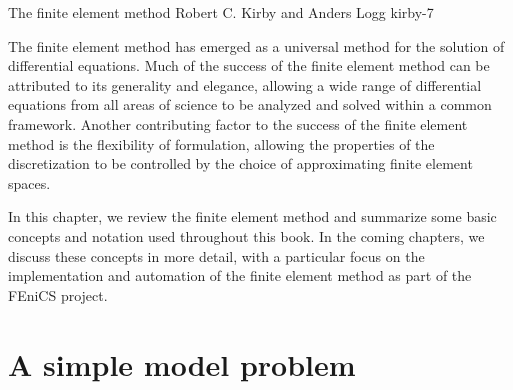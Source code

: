               {The finite element method}
              {Robert C. Kirby and Anders Logg}
              {kirby-7}

The finite element method has emerged as a universal method for the
solution of differential equations. Much of the success of the finite
element method can be attributed to its generality and elegance,
allowing a wide range of differential equations from all areas of
science to be analyzed and solved within a common framework. Another
contributing factor to the success of the finite element method is the
flexibility of formulation, allowing the properties of the
discretization to be controlled by the choice of approximating finite
element spaces.

In this chapter, we review the finite element method and summarize
some basic concepts and notation used throughout this book. In the
coming chapters, we discuss these concepts in more detail, with a
particular focus on the implementation and automation of the finite
element method as part of the FEniCS project.

\section{A simple model problem}

